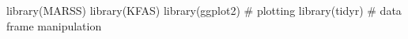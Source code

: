 \begin{Schunk}
\begin{Sinput}
 library(MARSS)
 library(KFAS)
 library(ggplot2) # plotting
 library(tidyr) # data frame manipulation
\end{Sinput}
\end{Schunk}
